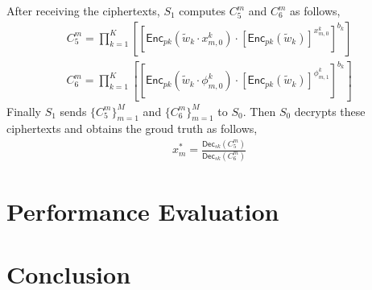 \documentclass[conference]{IEEEtran}
\begin{document}
After receiving the ciphertexts, $S_1$ computes $C_5^m$ and $C_6^m$ as follows,
\begin{equation}
  \begin{split}
    C_5^m = \prod_{k=1}^K\left[\left[\mathsf{Enc}_{pk}(\tilde{w}_k\cdot x_{m,0}^k)\cdot \left[\mathsf{Enc}_{pk}(\tilde{w}_k)\right]^{x_{m,0}^k}\right]^{b_k} \right]
  \end{split}
\end{equation}
\begin{equation}
  \begin{split}
    C_6^m = \prod_{k=1}^K \left[ \left[ \mathsf{Enc}_{pk}(\tilde{w}_k\cdot \phi_{m,0}^k) \cdot \left[\mathsf{Enc}_{pk}(\tilde{w}_k)\right]^{\phi_{m,1}^k}\right]^{b_k} \right]
  \end{split}
\end{equation}
Finally $S_1$ sends $\{C_5^m\}_{m=1}^M$ and $\{C_6^m\}_{m=1}^M$ to $S_0$.
Then $S_0$ decrypts these ciphertexts and obtains the groud truth as follows,
\begin{equation}
  \begin{split}
    x_m^* = \frac{\mathsf{Dec}_{sk}(C_5^m)}{\mathsf{Dec}_{sk}(C_6^m)}
  \end{split}
\end{equation}

\section{Performance Evaluation}\label{sec5}
\section{Conclusion}\label{sec6}




\vspace{12pt}
\end{document}
